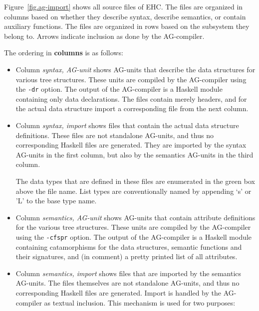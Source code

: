 Figure~\ref{fig.ag-import} shows all source files of EHC.
The files are organized in columns based on whether they describe syntax,
describe semantics, or contain auxiliary functions.
The files are organized in rows based on the subsystem they belong to.
Arrows indicate inclusion as done by the AG-compiler.

The ordering in {\bf columns} is as follows:
\begin{itemize}

\item 
Column {\em syntax, AG-unit}
shows AG-units that describe the data structures for various tree structures.
These units are compiled by the AG-compiler using the {\tt -dr} option.
The output of the AG-compiler is a Haskell module containing only data declarations.
The files contain merely headers, and for the actual data structure
import a corresponding file from the next column.

\item
Column {\em syntax, import}
shows files that contain the actual data structure definitions.
These files are not standalone AG-units, and thus no corresponding Haskell files
are generated.
They are imported by the syntax AG-units in the first column,
but also by the semantics AG-units in the third column.

The data types that are defined in these files are enumerated in the green box
above the file name. List types are conventionally named by appending `s' or 'L'
to the base type name.

\item
Column {\em semantics, AG-unit}
shows AG-units that contain attribute definitions for the various tree structures.
These units are compiled by the AG-compiler using the {\tt -cfspr} option.
The output of the AG-compiler is a Haskell module containing 
catamorphisms for the data structures,
semantic functions and their signatures,
and (in comment) a pretty printed list of all attributes.

\item
Column {\em semantics, import}
shows files that are imported by the semantics AG-units.
The files themselves are not standalone AG-units, and thus no corresponding Haskell files
are generated.
Import is handled by the AG-compiler as textual inclusion.
This mechanism is used for two purposes:


\end{itemize}
